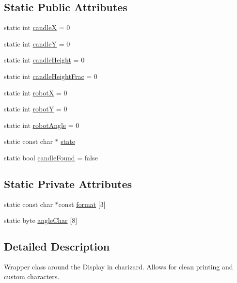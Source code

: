 \subsection*{Static Public Attributes}
\begin{DoxyCompactItemize}
\item 
static int \hyperlink{classStatusManager_a53de0b4eac2d76c8b2d075b8020d1c7f}{candle\-X} = 0
\item 
static int \hyperlink{classStatusManager_ac5a5ebf9f76a5ae36536be7fb2ce5383}{candle\-Y} = 0
\item 
static int \hyperlink{classStatusManager_a1a9f7a4fdb19e56e3f8352a78ea4648e}{candle\-Height} = 0
\item 
static int \hyperlink{classStatusManager_ac813f7d48ed51e0246126a53775c5b65}{candle\-Height\-Frac} = 0
\item 
static int \hyperlink{classStatusManager_a844d999c234bdcfcb0f465bdf2da9b72}{robot\-X} = 0
\item 
static int \hyperlink{classStatusManager_a2e09a9dcfcc6c38cae621c04f49c58b4}{robot\-Y} = 0
\item 
static int \hyperlink{classStatusManager_af55087be7ac997b2db4258b26c285f1d}{robot\-Angle} = 0
\item 
static const char $\ast$ \hyperlink{classStatusManager_a6f3c0467116c3bfbf9d7507cb04b7d5a}{state}
\item 
static bool \hyperlink{classStatusManager_addac8003cb381bc134170516966135aa}{candle\-Found} = false
\end{DoxyCompactItemize}
\subsection*{Static Private Attributes}
\begin{DoxyCompactItemize}
\item 
static const char $\ast$const \hyperlink{classStatusManager_a98bdd9d3e963455b576ff9a9bc5482ca}{format} \mbox{[}3\mbox{]}
\item 
static byte \hyperlink{classStatusManager_ad215f7e2fd44cebe76d6e60d40d110e6}{angle\-Char} \mbox{[}8\mbox{]}
\end{DoxyCompactItemize}


\subsection{Detailed Description}
Wrapper class around the Display in charizard. Allows for clean printing and custom characters. 

